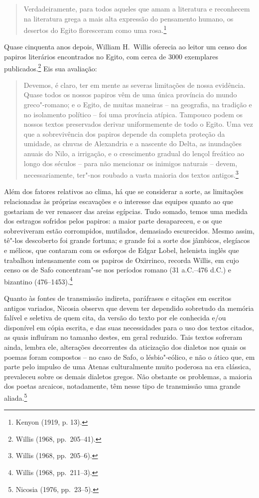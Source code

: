 \begin{quote}
Verdadeiramente, para todos aqueles que amam a literatura e reconhecem
na literatura grega a mais alta expressão do pensamento humano, os desertos do
Egito floresceram como uma rosa.\footnote{ Kenyon (1919, p. 13).}
\end{quote}


Quase cinquenta anos depois, William H.~Willis oferecia ao
leitor um censo dos papiros literários encontrados no Egito, com cerca de 3000
exemplares publicados.\footnote{ Willis (1968, pp.~205--41).} Eis sua avaliação: 

\begin{quote}
Devemos, é claro, ter em mente as severas limitações de nossa evidência. Quase
todos os nossos papiros vêm de uma única província do mundo greco"-romano; e o
Egito, de muitas maneiras -- na geografia, na tradição e no isolamento político
-- foi uma província atípica. Tampouco podem os nossos textos preservados
derivar uniformemente de todo o Egito. Uma vez que a sobrevivência dos papiros
depende da completa proteção da umidade, as chuvas de Alexandria e a nascente
do Delta, as inundações anuais do Nilo, a irrigação, e o crescimento gradual do
lençol freático ao longo dos séculos -- para não mencionar os inimigos naturais
-- devem, necessariamente, ter"-nos roubado a vasta maioria dos textos antigos.\footnote{ Willis (1968, pp.~205--6).}
\end{quote}

Além dos fatores relativos ao clima, há que se considerar a sorte, as limitações
relacionadas às próprias escavações e o interesse das equipes quanto ao que
gostariam de ver renascer das areias egípcias. Tudo somado, temos uma medida
dos estragos sofridos pelos papiros: a maior parte desapareceu, e os que
sobreviveram estão corrompidos, mutilados, demasiado escurecidos. Mesmo assim,
tê"-los descoberto foi grande fortuna; e grande foi a sorte dos jâmbicos,
elegíacos e mélicos, que contaram com os esforços de Edgar Lobel, helenista
inglês que trabalhou intensamente com os papiros de Oxirrinco, recorda Willis,
em cujo censo os de Safo concentram"-se nos períodos
romano (31 a.C.--476 d.C.) e bizantino (476--1453).\footnote{ Willis (1968, pp.~211--3).}

Quanto às fontes de transmissão indireta, paráfrases e citações em escritos
antigos variados, Nicosia observa que devem ter dependido
sobretudo da memória falível e seletiva de quem cita, da versão do texto por
ele conhecida e/ou disponível em cópia escrita, e das suas necessidades para o
uso dos textos citados, as quais influíram no tamanho destes, em geral
reduzido. Tais textos sofreram ainda, lembra ele, alterações decorrentes da
aticização dos dialetos nos quais os poemas foram compostos -- no caso de Safo,
o lésbio"-eólico, e não o ático que, em parte pelo impulso de uma Atenas
culturalmente muito poderosa na era clássica, prevaleceu sobre os demais
dialetos gregos. Não obstante os problemas, a maioria dos poetas
arcaicos, notadamente, têm nesse tipo de transmissão uma grande aliada.\footnote{ Nicosia (1976, pp.~23--5).}

